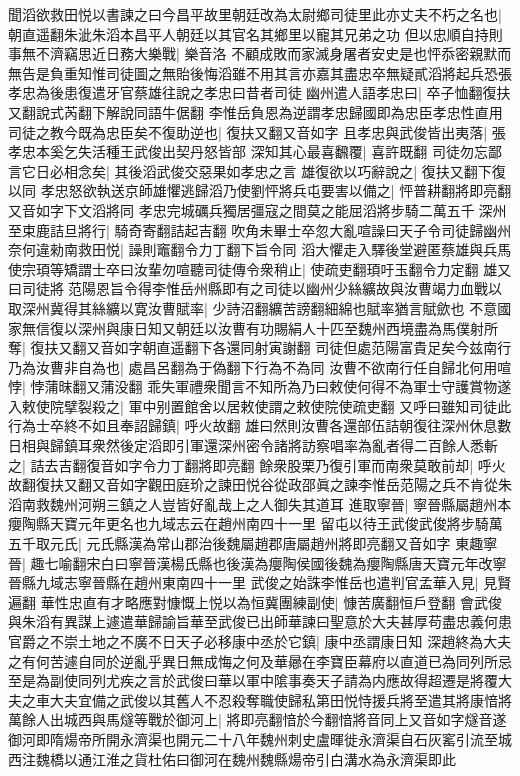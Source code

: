 聞滔欲救田悦以書諫之曰今昌平故里朝廷改為太尉鄉司徒里此亦丈夫不朽之名也|{
	朝直遥翻朱泚朱滔本昌平人朝廷以其官名其鄉里以寵其兄弟之功}
但以忠順自持則事無不濟竊思近日務大樂戰|{
	樂音洛}
不顧成敗而家滅身屠者安史是也怦忝密親默而無告是負重知惟司徒圖之無貽後悔滔雖不用其言亦嘉其盡忠卒無疑貳滔將起兵恐張孝忠為後患復遣牙官蔡雄往說之孝忠曰昔者司徒幽州遣人語孝忠曰|{
	卒子恤翻復扶又翻說式芮翻下解說同語牛倨翻}
李惟岳負恩為逆謂孝忠歸國即為忠臣孝忠性直用司徒之教今既為忠臣矣不復助逆也|{
	復扶又翻又音如字}
且孝忠與武俊皆出夷落|{
	張孝忠本奚乞失活種王武俊出契丹怒皆部}
深知其心最喜飜覆|{
	喜許既翻}
司徒勿忘鄙言它日必相念矣|{
	其後滔武俊交惡果如孝忠之言}
雄復欲以巧辭說之|{
	復扶又翻下復以同}
孝忠怒欲執送京師雄懼逃歸滔乃使劉怦將兵屯要害以備之|{
	怦普耕翻將即亮翻又音如字下文滔將同}
孝忠完城礪兵獨居彊寇之間莫之能屈滔將步騎二萬五千深州至束鹿詰旦將行|{
	騎奇寄翻詰起吉翻}
吹角未畢士卒忽大亂喧譟曰天子令司徒歸幽州奈何違勑南救田悦|{
	譟則竈翻令力丁翻下旨令同}
滔大懼走入驛後堂避匿蔡雄與兵馬使宗頊等矯謂士卒曰汝輩勿喧聽司徒傳令衆稍止|{
	使疏吏翻頊吁玉翻令力定翻}
雄又曰司徒將范陽恩旨令得李惟岳州縣即有之司徒以幽州少絲纊故與汝曹竭力血戰以取深州冀得其絲纊以寛汝曹賦率|{
	少詩沼翻纊苦謗翻細綿也賦率猶言賦歛也}
不意國家無信復以深州與康日知又朝廷以汝曹有功賜絹人十匹至魏州西境盡為馬僕射所奪|{
	復扶又翻又音如字朝直遥翻下各還同射寅謝翻}
司徒但處范陽富貴足矣今兹南行乃為汝曹非自為也|{
	處昌呂翻為于偽翻下行為不為同}
汝曹不欲南行任自歸北何用喧悖|{
	悖蒲昩翻又蒲没翻}
乖失軍禮衆聞言不知所為乃曰敕使何得不為軍士守護賞物遂入敕使院擘裂殺之|{
	軍中别置館舍以居敕使謂之敕使院使疏吏翻}
又呼曰雖知司徒此行為士卒終不如且奉詔歸鎮|{
	呼火故翻}
雄曰然則汝曹各還部伍詰朝復往深州休息數日相與歸鎮耳衆然後定滔即引軍還深州密令諸將訪察唱率為亂者得二百餘人悉斬之|{
	詰去吉翻復音如字令力丁翻將即亮翻}
餘衆股栗乃復引軍而南衆莫敢前却|{
	呼火故翻復扶又翻又音如字觀田庭玠之諫田悦谷從政邵眞之諫李惟岳范陽之兵不肯從朱滔南救魏州河朔三鎮之人豈皆好亂哉上之人御失其道耳}
進取寧晉|{
	寧晉縣屬趙州本癭陶縣天寶元年更名也九域志云在趙州南四十一里}
留屯以待王武俊武俊將步騎萬五千取元氏|{
	元氏縣漢為常山郡治後魏屬趙郡唐屬趙州將即亮翻又音如字}
東趣寧晉|{
	趣七喻翻宋白曰寧晉漢楊氏縣也後漢為癭陶侯國後魏為癭陶縣唐天寶元年改寧晉縣九域志寧晉縣在趙州東南四十一里}
武俊之始誅李惟岳也遣判官孟華入見|{
	見賢遍翻}
華性忠直有才略應對慷慨上悦以為恒冀團練副使|{
	慷苦廣翻恒戶登翻}
會武俊與朱滔有異謀上遽遣華歸諭旨華至武俊已出師華諫曰聖意於大夫甚厚苟盡忠義何患官爵之不崇土地之不廣不日天子必移康中丞於它鎮|{
	康中丞謂康日知}
深趙終為大夫之有何苦遽自同於逆亂乎異日無成悔之何及華曏在李寶臣幕府以直道已為同列所忌至是為副使同列尤疾之言於武俊曰華以軍中隂事奏天子請為内應故得超遷是將覆大夫之車大夫宜備之武俊以其舊人不忍殺奪職使歸私第田悦恃援兵將至遣其將康愔將萬餘人出城西與馬燧等戰於御河上|{
	將即亮翻愔於今翻愔將音同上又音如字燧音遂御河即隋煬帝所開永濟渠也開元二十八年魏州刺史盧暉徙永濟渠自石灰窰引流至城西注魏橋以通江淮之貨杜佑曰御河在魏州魏縣煬帝引白溝水為永濟渠即此}
